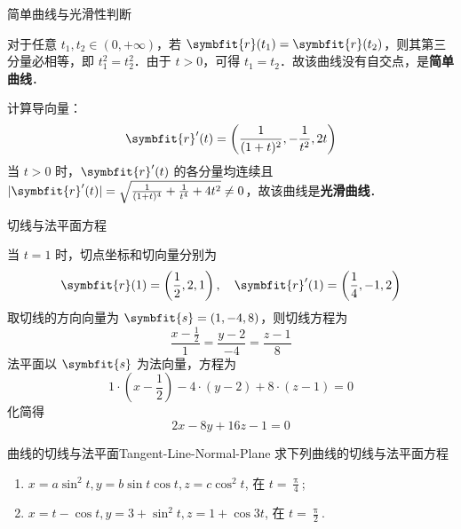 \begin{solution}
     简单曲线与光滑性判断

    对于任意 $t_1, t_2 \in (0, +\infty)$，若 $\symbfit{r}(t_1) = \symbfit{r}(t_2)$，则其第三分量必相等，即 $t_1^2 = t_2^2$．由于 $t > 0$，可得 $t_1 = t_2$．故该曲线没有自交点，是\textbf{简单曲线}．

    计算导向量：
    \begin{equation}
        \symbfit{r}'(t) = \left( \frac{1}{(1+t)^2}, -\frac{1}{t^2}, 2t \right)
    \end{equation}
    当 $t > 0$ 时，$\symbfit{r}'(t)$ 的各分量均连续且 $|\symbfit{r}'(t)| = \sqrt{\frac{1}{(1+t)^4} + \frac{1}{t^4} + 4t^2} \neq 0$，故该曲线是\textbf{光滑曲线}．

     切线与法平面方程

    当 $t = 1$ 时，切点坐标和切向量分别为
    \begin{equation}
        \symbfit{r}(1) = \left( \frac{1}{2}, 2, 1 \right), \quad \symbfit{r}'(1) = \left( \frac{1}{4}, -1, 2 \right)
    \end{equation}
    取切线的方向向量为 $\symbfit{s} = (1, -4, 8)$，则切线方程为
    \begin{equation}
        \boxed{\frac{x - \frac{1}{2}}{1} = \frac{y - 2}{-4} = \frac{z - 1}{8}}
    \end{equation}
    法平面以 $\symbfit{s}$ 为法向量，方程为
    \begin{equation}
        1 \cdot \left( x - \frac{1}{2} \right) - 4 \cdot (y - 2) + 8 \cdot (z - 1) = 0
    \end{equation}
    化简得
    \begin{equation}
        \boxed{2x - 8y + 16z - 1 = 0}
    \end{equation}
\end{solution}


\begin{problem}{曲线的切线与法平面}{Tangent-Line-Normal-Plane}
    求下列曲线的切线与法平面方程
    \begin{enumerate}
        \item $x = a \sin^2 t, y = b \sin t \cos t, z = c \cos^2 t$, 在 $t = \frac{\uppi}{4}$;
        \item $x = t - \cos t, y = 3 + \sin^2 t, z = 1 + \cos 3t$, 在 $t = \frac{\uppi}{2}$.
    \end{enumerate}
\end{problem}

